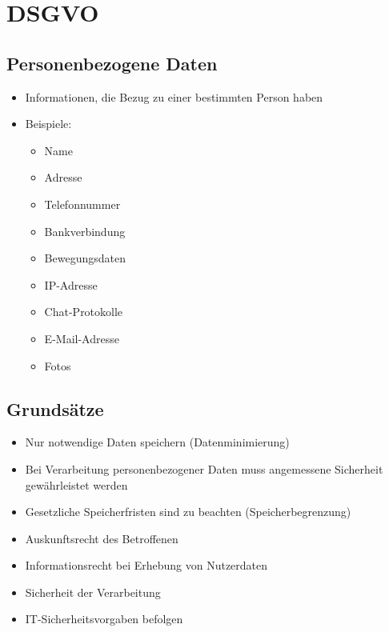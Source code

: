 \section{DSGVO}

\subsection{Personenbezogene Daten}

\begin{frame}
\begin{itemize}
	\item Informationen, die Bezug zu einer bestimmten Person haben
	\item Beispiele:
	\begin{itemize}
	  \item Name
	  \item Adresse
	  \item Telefonnummer
	  \item Bankverbindung
	  \item Bewegungsdaten
	  \item IP-Adresse
	  \item Chat-Protokolle
	  \item E-Mail-Adresse
	  \item Fotos
	\end{itemize}
\end{itemize}
\end{frame}

\subsection{Grundsätze}

\begin{frame}
\begin{itemize}
	\item Nur notwendige Daten speichern (Datenminimierung)
	\item Bei Verarbeitung personenbezogener Daten muss angemessene Sicherheit gewährleistet werden
	\item Gesetzliche Speicherfristen sind zu beachten (Speicherbegrenzung)
	\item Auskunftsrecht des Betroffenen
	\item Informationsrecht bei Erhebung von Nutzerdaten
	\item Sicherheit der Verarbeitung
	\item IT-Sicherheitsvorgaben befolgen
\end{itemize}
\end{frame}

